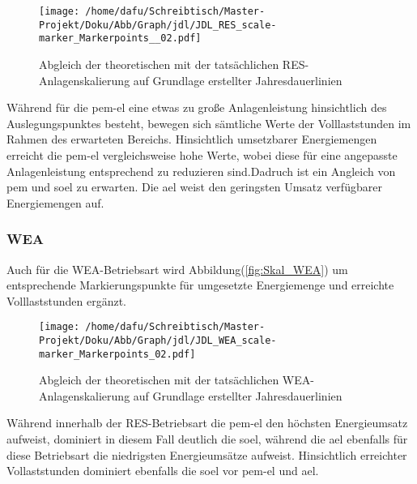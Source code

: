 \documentclass[onecolumn,10pt,titlepage]{article}
\begin{document}
\begin{figure}[H]
	
	\centering
	\texttt{[image: /home/dafu/Schreibtisch/Master-Projekt/Doku/Abb/Graph/jdl/JDL\_RES\_scale-marker\_Markerpoints\_\_02.pdf]}
	\caption[Abgleich Anlagenskalierung -RES]{Abgleich der theoretischen mit der tatsächlichen RES-Anlagenskalierung auf Grundlage erstellter Jahresdauerlinien}
	\label{fig:ABGL_SKAL_RES} 
\end{figure}
Während für die \gls{pem}-\gls{el} eine etwas zu große Anlagenleistung hinsichtlich des Auslegungspunktes besteht, bewegen sich sämtliche Werte der Volllaststunden im Rahmen des erwarteten Bereichs. Hinsichtlich umsetzbarer Energiemengen erreicht die \gls{pem}-\gls{el} vergleichsweise hohe Werte, wobei diese für eine angepasste Anlagenleistung entsprechend zu reduzieren sind.Dadruch ist ein Angleich von \gls{pem} und \gls{soel} zu erwarten. Die \gls{ael} weist den geringsten Umsatz verfügbarer Energiemengen auf.  
\newpage
\subsubsection{WEA}
Auch für die WEA-Betriebsart wird Abbildung(\ref{fig:Skal_WEA}) um entsprechende Markierungspunkte für umgesetzte Energiemenge und erreichte Volllaststunden ergänzt.\\

\begin{figure}[H]
	
	\centering
	\texttt{[image: /home/dafu/Schreibtisch/Master-Projekt/Doku/Abb/Graph/jdl/JDL\_WEA\_scale-marker\_Markerpoints\_02.pdf]}
	\caption[Abgleich Anlagenskalierung -WEA]{Abgleich der theoretischen mit der tatsächlichen WEA-Anlagenskalierung auf Grundlage erstellter Jahresdauerlinien}
	\label{fig:ABGL_SKAL_WEA} 
\end{figure}
Während innerhalb der RES-Betriebsart die \gls{pem}-\gls{el} den höchsten Energieumsatz aufweist, dominiert in diesem Fall deutlich die \gls{soel}, während die \gls{ael} ebenfalls für diese Betriebsart die niedrigsten Energieumsätze aufweist. Hinsichtlich erreichter Vollaststunden dominiert ebenfalls die \gls{soel} vor \gls{pem}-\gls{el} und \gls{ael}. 
\end{document}
